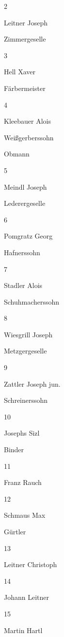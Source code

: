 \documentclass[12pt,a4paper]{book}
\begin{document}
2

Leitner Joseph

Zimmergeselle



3

Hell Xaver

Färbermeister



4

Kleebauer Alois

Weißgerberssohn

Obmann

5

Meindl Joseph

Lederergeselle



6

Pomgratz Georg

Hafnerssohn



7

Stadler Alois

Schuhmacherssohn



8

Wiesgrill Joseph

Metzgergeselle



9

Zattler Joseph jun.

Schreinerssohn



10

Josephs Sizl

Binder



11

Franz Rauch





12

Schmaus Max

Gürtler



13

Leitner Christoph





14

Johann Leitner





15

Martin Hartl
\end{document}
